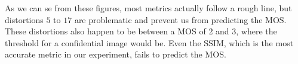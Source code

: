 \documentclass{article}
\begin{document}


As we can se from these figures, most metrics actually follow a rough line, but distortions $5$ to $17$ are problematic and prevent us from predicting the MOS. These distortions also happen to be between a MOS of 2 and 3, where the threshold for a confidential image would be. Even the SSIM, which is the most accurate metric in our experiment, fails to predict the MOS.%
\end{document}
